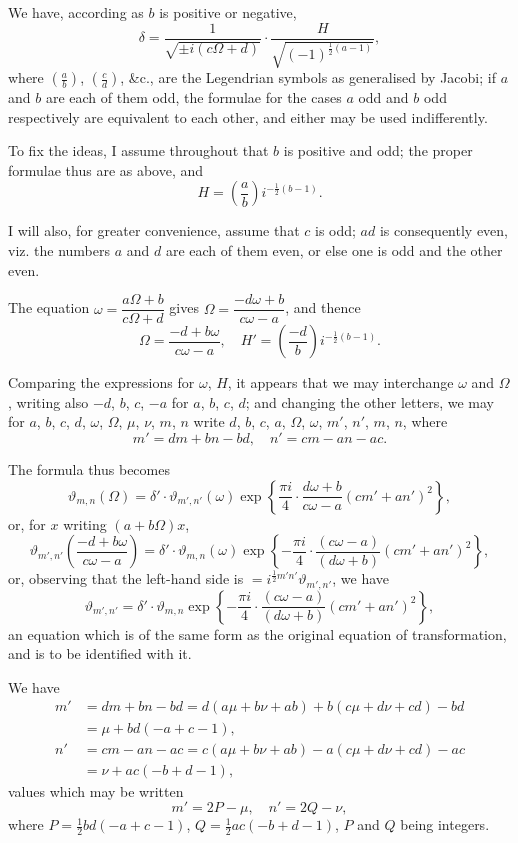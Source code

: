 \documentclass[11pt,a4paper]{book}
\begin{document}
We have, according as $b$ is positive or negative,
\[
\delta = \frac{1}{\sqrt{\pm i(c\Omega + d)}} \cdot \frac{H}{\sqrt{(-1)^{\frac{1}{2}(a-1)}}},
\]
where $\left(\frac{a}{b}\right)$, $\left(\frac{c}{d}\right)$, \&c., are the Legendrian symbols as generalised by Jacobi; if $a$ and $b$ are each of them odd, the formulae for the cases $a$ odd and $b$ odd respectively are equivalent to each other, and either may be used indifferently.

To fix the ideas, I assume throughout that $b$ is positive and odd; the proper formulae thus are as above, and
\[
H = \left(\frac{a}{b}\right)i^{-\frac{1}{2}(b-1)}.
\]

I will also, for greater convenience, assume that $c$ is odd; $ad$ is consequently even, viz. the numbers $a$ and $d$ are each of them even, or else one is odd and the other even.

The equation $\omega = \dfrac{a\Omega + b}{c\Omega + d}$ gives $\Omega = \dfrac{-d\omega + b}{c\omega - a}$, and thence
\[
\Omega = \frac{-d + b\omega}{c\omega - a}, \quad H' = \left(\frac{-d}{b}\right)i^{-\frac{1}{2}(b-1)}.
\]

Comparing the expressions for $\omega$, $H$, it appears that we may interchange $\omega$ and $\Omega$, writing also $-d$, $b$, $c$, $-a$ for $a$, $b$, $c$, $d$; and changing the other letters, we may for $a$, $b$, $c$, $d$, $\omega$, $\Omega$, $\mu$, $\nu$, $m$, $n$ write $d$, $b$, $c$, $a$, $\Omega$, $\omega$, $m'$, $n'$, $m$, $n$, where
\[
m' = dm + bn - bd, \quad n' = cm - an - ac.
\]

The formula thus becomes
\[
\vartheta_{m,n}(\Omega) = \delta' \cdot \vartheta_{m',n'}(\omega) \exp\left\{\frac{\pi i}{4}\cdot\frac{d\omega + b}{c\omega - a}(cm' + an')^2\right\},
\]
or, for $x$ writing $(a + b\Omega)x$,
\[
\vartheta_{m',n'}\left(\frac{-d + b\omega}{c\omega - a}\right) = \delta' \cdot \vartheta_{m,n}(\omega) \exp\left\{-\frac{\pi i}{4}\cdot\frac{(c\omega - a)}{(d\omega + b)}(cm' + an')^2\right\},
\]
or, observing that the left-hand side is $= i^{\frac{1}{2}m'n'}\vartheta_{m',n'}$, we have
\[
\vartheta_{m',n'} = \delta' \cdot \vartheta_{m,n} \exp\left\{-\frac{\pi i}{4}\cdot\frac{(c\omega - a)}{(d\omega + b)}(cm' + an')^2\right\},
\]
an equation which is of the same form as the original equation of transformation, and is to be identified with it.

We have
\begin{align*}
m' &= dm + bn - bd = d(a\mu + b\nu + ab) + b(c\mu + d\nu + cd) - bd \\
&= \mu + bd(-a + c - 1),\\
n' &= cm - an - ac = c(a\mu + b\nu + ab) - a(c\mu + d\nu + cd) - ac \\
&= \nu + ac(-b + d - 1),
\end{align*}
values which may be written
\[
m' = 2P - \mu, \quad n' = 2Q - \nu,
\]
where $P = \frac{1}{2}bd(-a + c - 1)$, $Q = \frac{1}{2}ac(-b + d - 1)$, $P$ and $Q$ being integers.
\end{document}

